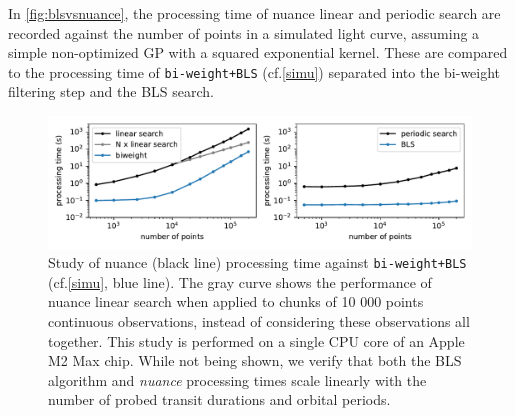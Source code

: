 \documentclass[modern]{aastex631}
\newcommand{\nuancemethod}{\textit{nuance}}
\newcommand{\nuancecode}{\textsf{nuance}}
\begin{document}
\noindent In \autoref{fig:blsvsnuance}, the processing time of \nuancecode{} linear and periodic search are recorded against the number of points in a simulated light curve, assuming a simple non-optimized GP with a squared exponential kernel. These are compared to the processing time of \texttt{bi-weight+BLS} (cf.\;\autoref{simu}) separated into the bi-weight filtering step and the BLS search.
\begin{figure}[H]
    \begin{centering}
        \includegraphics[width=\linewidth]{../workflows/benchmark/figures/nuance_vs_bls.pdf}
        \caption{Study of \textsf{nuance} (black line) processing time against \texttt{bi-weight+BLS} (cf.\;\autoref{simu}, blue line). The gray curve shows the performance of \textsf{nuance} linear search when applied to chunks of 10 000 points continuous observations, instead of considering these observations all together. This study is performed on a single CPU core of an Apple M2 Max chip. While not being shown, we verify that both the BLS algorithm and \nuancemethod{} processing times scale linearly with the number of probed transit durations and orbital periods.}
        \label{fig:blsvsnuance}
    \end{centering}
\end{figure}
\end{document}
